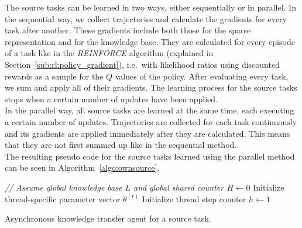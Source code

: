 The source tasks can be learned in two ways, either sequentially or in parallel.
In the sequential way, we collect trajectories and calculate the gradients for every task after another.
These gradients include both those for the sparse representation and for the knowledge base.
They are calculated for every episode of a task like in the \textit{REINFORCE} algorithm (explained in Section~\ref{sub:rl:policy_gradient}), i.e.\ with likelihood ratios using discounted rewards as a sample for the $Q$ values of the policy.
After evaluating every task, we sum and apply all of their gradients.
The learning process for the source tasks stops when a certain number of updates have been applied.\\
In the parallel way, all source tasks are learned at the same time, each executing a certain number of updates.
Trajectories are collected for each task continuously and its gradients are applied immediately after they are calculated.
This means that they are not first summed up like in the sequential method.\\
The resulting pseudo code for the source tasks learned using the parallel method can be seen in Algorithm~\ref{algo:ownsource}.\\
\begin{algorithm}[H]
\DontPrintSemicolon
\emph{// Assume global knowledge base $L$ and global shared counter $H \gets 0$}\;
Initialize thread-specific parameter vector $\theta^{(t)}$\;
Initialize thread step counter $h\gets 1$\;
\caption[Asynchronous knowledge transfer agent for a source task]{Asynchronous knowledge transfer agent for a source task.}
\label{algo:ownsource}
\end{algorithm}

